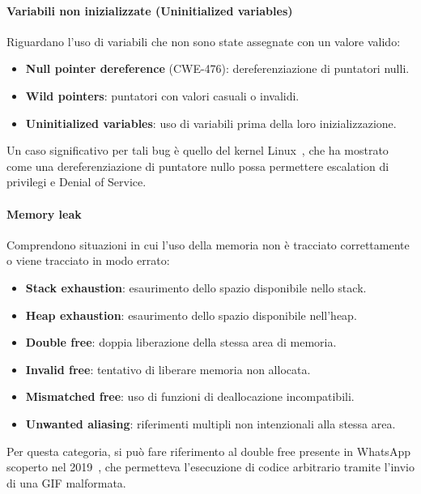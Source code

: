 \paragraph{Variabili non inizializzate (Uninitialized variables)}
\label{sec:uninitialized}

Riguardano l'uso di variabili che non sono state assegnate con un valore valido:
\begin{itemize}
  \item \textbf{Null pointer dereference} (CWE-476): dereferenziazione di puntatori
    nulli.

  \item \textbf{Wild pointers}: puntatori con valori casuali o invalidi.

  \item \textbf{Uninitialized variables}: uso di variabili prima della loro inizializzazione.
\end{itemize}
Un caso significativo per tali bug è quello del kernel Linux~\cite{null_pointer_dereference_linux},
che ha mostrato come una dereferenziazione di puntatore nullo possa permettere escalation
di privilegi e Denial of Service.

\paragraph{Memory leak}
\label{sec:memory_leaks}

Comprendono situazioni in cui l'uso della memoria non è tracciato correttamente o
viene tracciato in modo errato:
\begin{itemize}
  \item \textbf{Stack exhaustion}: esaurimento dello spazio disponibile nello stack.

  \item \textbf{Heap exhaustion}: esaurimento dello spazio disponibile nell'heap.

  \item \textbf{Double free}: doppia liberazione della stessa area di memoria.

  \item \textbf{Invalid free}: tentativo di liberare memoria non allocata.

  \item \textbf{Mismatched free}: uso di funzioni di deallocazione incompatibili.

  \item \textbf{Unwanted aliasing}: riferimenti multipli non intenzionali alla stessa
    area.
\end{itemize}
Per questa categoria, si può fare riferimento al double free presente in WhatsApp
scoperto nel 2019~\cite{whatsapp_double_free}, che permetteva l'esecuzione di codice
arbitrario tramite l'invio di una GIF malformata.

